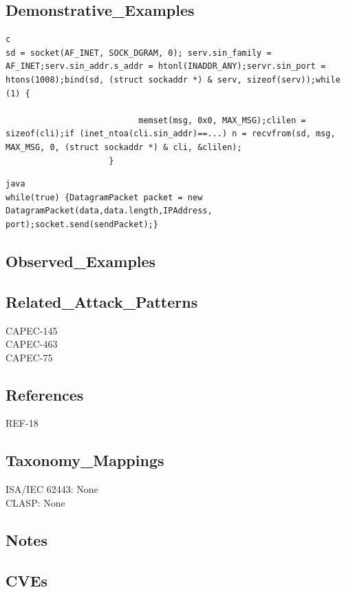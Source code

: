 \subsection*{Demonstrative\_Examples}
\begin{lstlisting}[breaklines=true,postbreak=\mbox{$\hookrightarrow$\space}]
c
sd = socket(AF_INET, SOCK_DGRAM, 0); serv.sin_family = AF_INET;serv.sin_addr.s_addr = htonl(INADDR_ANY);servr.sin_port = htons(1008);bind(sd, (struct sockaddr *) & serv, sizeof(serv));while (1) {
                        
                           memset(msg, 0x0, MAX_MSG);clilen = sizeof(cli);if (inet_ntoa(cli.sin_addr)==...) n = recvfrom(sd, msg, MAX_MSG, 0, (struct sockaddr *) & cli, &clilen);
                     }
\end{lstlisting}

\begin{lstlisting}[breaklines=true,postbreak=\mbox{$\hookrightarrow$\space}]
java
while(true) {DatagramPacket packet = new DatagramPacket(data,data.length,IPAddress, port);socket.send(sendPacket);}
\end{lstlisting}

\subsection*{Observed\_Examples}
\subsection*{Related\_Attack\_Patterns}
CAPEC-145\\
CAPEC-463\\
CAPEC-75\\
\subsection*{References}
REF-18\\
\subsection*{Taxonomy\_Mappings}
ISA/IEC 62443: None\\
CLASP: None\\
\subsection*{Notes}
\subsection*{CVEs}
